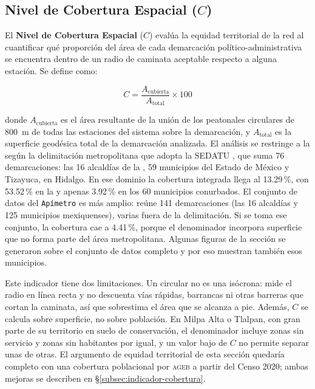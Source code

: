 \subsection{Nivel de Cobertura Espacial (\texorpdfstring{$C$}{C})}
\label{subsec:cobertura-espacial}

El \textbf{Nivel de Cobertura Espacial} ($C$) evalúa la equidad territorial de
la red al cuantificar qué proporción del área de cada demarcación
político-administrativa se encuentra dentro de un radio de caminata aceptable
respecto a alguna estación. Se define como:

\begin{equation}
    C = \frac{A_{\text{cubierta}}}{A_{\text{total}}} \times 100
    \label{eq:cobertura-res}
\end{equation}

donde $A_{\text{cubierta}}$ es el área resultante de la unión de los
 peatonales circulares de 800~m de todas las estaciones del
sistema sobre la demarcación, y $A_{\text{total}}$ es la superficie geodésica
total de la demarcación analizada. El análisis se restringe a la \zmvm{} según
la delimitación metropolitana que adopta la SEDATU \citep{SEDATU2023}, que suma
76 demarcaciones: las 16 alcaldías de la \cdmx{}, 59 municipios del Estado de
México y Tizayuca, en Hidalgo. En ese dominio la cobertura integrada llega al
13.29\,\%, con 53.52\,\% en la \cdmx{} y apenas 3.92\,\% en los 60 municipios
conurbados. El conjunto de datos del \texttt{Apímetro} \citep{cabrera2025apimetro} es más
amplio: reúne 141 demarcaciones (las 16 alcaldías y 125 municipios mexiquenses),
varias fuera de la delimitación. Si se toma ese conjunto, la cobertura cae a
4.41\,\%, porque el denominador incorpora superficie que no forma parte del área
metropolitana. Algunas figuras de la sección se generaron sobre el conjunto de datos
completo y por eso muestran también esos municipios.

Este indicador tiene dos limitaciones. Un  circular no es una
isócrona: mide el radio en línea recta y no descuenta vías rápidas, barrancas ni
otras barreras que cortan la caminata, así que sobrestima el área que se alcanza
a pie. Además, $C$ se calcula sobre superficie, no sobre población. En Milpa
Alta o Tlalpan, con gran parte de su territorio en suelo de conservación, el
denominador incluye zonas sin servicio y zonas sin habitantes por igual, y un
valor bajo de $C$ no permite separar unas de otras. El argumento de equidad
territorial de esta sección quedaría completo con una cobertura poblacional por
\textsc{ageb} a partir del Censo 2020; ambas mejoras se describen en
§\ref{subsec:indicador-cobertura}.

